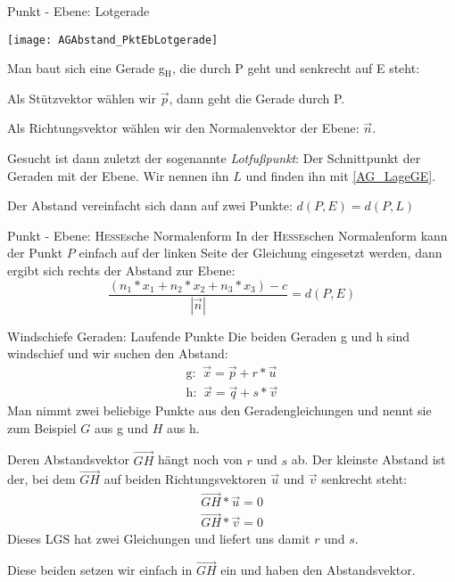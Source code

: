 \begin{bla}{Punkt - Ebene: Lotgerade}
  \begin{marginfigure}[5em]
    \texttt{[image: AGAbstand\_PktEbLotgerade]}
    \caption{Lotgerade, senkrecht zur Ebene E, durch Punkt $P$}
  \end{marginfigure}
  Man baut sich eine Gerade g$_\text{H}$, die durch P geht und senkrecht auf E steht:

  Als Stützvektor wählen wir $\vec{p}$, dann geht die Gerade durch P.

  Als Richtungsvektor wählen wir den Normalenvektor der Ebene: $\vec{n}$.

  Gesucht ist dann zuletzt der sogenannte \emph{Lotfußpunkt}: Der Schnittpunkt der Geraden mit der Ebene.
  Wir nennen ihn $L$ und finden ihn mit \ref{AG_LageGE}.

  Der Abstand vereinfacht sich dann auf zwei Punkte:
  $d(P,E) = d(P,L)$
\end{bla}

\begin{bla}{Punkt - Ebene: \textsc{Hesse}sche Normalenform}
  In der \textsc{Hesse}schen Normalenform kann der Punkt $P$ einfach auf der linken Seite der Gleichung eingesetzt werden, dann ergibt sich rechts der Abstand zur Ebene:
  \[
  \frac{ \left(n_1*x_1 + n_2*x_2 + n_3*x_3\right) - c}{|\vec{n}|}
  = d(P,E)
  \]
\end{bla}

\begin{bla}{Windschiefe Geraden: Laufende Punkte}
  Die beiden Geraden g und h sind windschief und wir suchen den Abstand:
  \begin{align*}
    \text{g: }\ \vec{x} = \vec{p} + r * \vec{u} \\
    \text{h: }\ \vec{x} = \vec{q} + s * \vec{v}
  \end{align*}
  Man nimmt zwei beliebige Punkte aus den Geradengleichungen und nennt sie zum Beispiel $G$ aus g und $H$ aus h.

  Deren Abstandsvektor $\overrightarrow{GH}$ hängt noch von $r$ und $s$ ab.
  Der kleinste Abstand ist der, bei dem $\overrightarrow{GH}$ auf beiden Richtungsvektoren $\vec{u}$ und $\vec{v}$ senkrecht steht:
  \begin{align*}
    \overrightarrow{GH} * \vec{u} = 0 \\
    \overrightarrow{GH} * \vec{v} = 0
  \end{align*}
  Dieses LGS hat zwei Gleichungen und liefert uns damit $r$ und $s$.

  Diese beiden setzen wir einfach in $\overrightarrow{GH}$ ein und haben den Abstandsvektor.
\end{bla}



